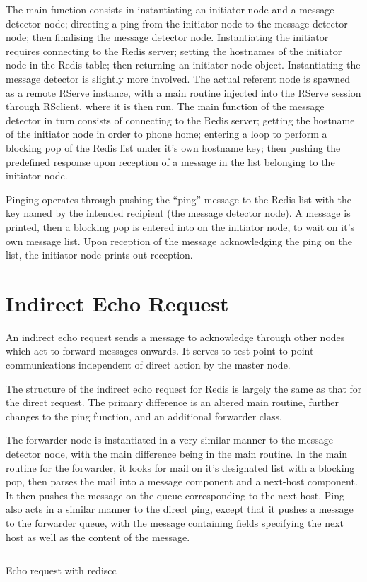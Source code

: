 \documentclass[10pt,a4paper]{article}
\begin{document}
The main function consists in instantiating an initiator node and a message
detector node; directing a ping from the initiator node to the message detector
node; then finalising the message detector node.
Instantiating the initiator requires connecting to the Redis server; setting
the hostnames of the initiator node in the Redis table; then returning an
initiator node object.
Instantiating the message detector is slightly more involved. The actual
referent node is spawned as a remote RServe instance, with a main routine
injected into the RServe session through RSclient, where it is then run.
The main function of the message detector in turn consists of connecting to the
Redis server; getting the hostname of the initiator node in order to phone
home; entering a loop to perform a blocking pop of the Redis list under it's
own hostname key; then pushing the predefined response upon reception of a
message in the list belonging to the initiator node.

Pinging operates through pushing the ``ping'' message to the Redis list with
the key named by the intended recipient (the message detector node). 
A message is printed, then a blocking pop is entered into on the initiator
node, to wait on it's own message list. 
Upon reception of the message acknowledging the ping on the list, the initiator
node prints out reception.

\section{Indirect Echo Request}
An indirect echo request sends a message to acknowledge through other nodes
which act to forward messages onwards.
It serves to test point-to-point communications independent of direct action by
the master node.

The structure of the indirect echo request for Redis is largely the same as
that for the direct request.
The primary difference is an altered main routine, further changes to the ping
function, and an additional forwarder class.

The forwarder node is instantiated in a very similar manner to the message
detector node, with the main difference being in the main routine.
In the main routine for the forwarder, it looks for mail on it's designated
list with a blocking pop, then parses the mail into a message component and a
next-host component. 
It then pushes the message on the queue corresponding to the next host.
Ping also acts in a similar manner to the direct ping, except that it pushes a
message to the forwarder queue, with the message containing fields specifying
the next host as well as the content of the message.

\begin{listing}
	\inputminted{r}{R/rediscc-echo-request.R}
	\caption{Echo request with rediscc}
	\label{src:redis-echo}
\end{listing}

\printbibliography{}
\end{document}
